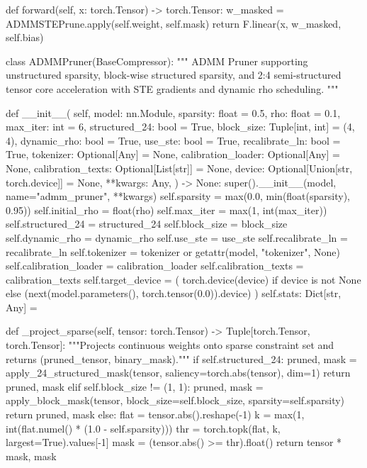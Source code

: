    def forward(self, x: torch.Tensor) -> torch.Tensor:
        w\_masked = ADMMSTEPrune.apply(self.weight, self.mask)
        return F.linear(x, w\_masked, self.bias)


class ADMMPruner(BaseCompressor):
    """
    ADMM Pruner supporting unstructured sparsity, block-wise structured sparsity,
    and 2:4 semi-structured tensor core acceleration with STE gradients and dynamic rho scheduling.
    """

    def \_\_init\_\_(
        self,
        model: nn.Module,
        sparsity: float = 0.5,
        rho: float = 0.1,
        max\_iter: int = 6,
        structured\_24: bool = True,
        block\_size: Tuple[int, int] = (4, 4),
        dynamic\_rho: bool = True,
        use\_ste: bool = True,
        recalibrate\_ln: bool = True,
        tokenizer: Optional[Any] = None,
        calibration\_loader: Optional[Any] = None,
        calibration\_texts: Optional[List[str]] = None,
        device: Optional[Union[str, torch.device]] = None,
        **kwargs: Any,
    ) -> None:
        super().\_\_init\_\_(model, name="admm\_pruner", **kwargs)
        self.sparsity = max(0.0, min(float(sparsity), 0.95))
        self.initial\_rho = float(rho)
        self.max\_iter = max(1, int(max\_iter))
        self.structured\_24 = structured\_24
        self.block\_size = block\_size
        self.dynamic\_rho = dynamic\_rho
        self.use\_ste = use\_ste
        self.recalibrate\_ln = recalibrate\_ln
        self.tokenizer = tokenizer or getattr(model, "tokenizer", None)
        self.calibration\_loader = calibration\_loader
        self.calibration\_texts = calibration\_texts
        self.target\_device = (
            torch.device(device)
            if device is not None
            else (next(model.parameters(), torch.tensor(0.0)).device)
        )
        self.stats: Dict[str, Any] = {}

    def \_project\_sparse(self, tensor: torch.Tensor) -> Tuple[torch.Tensor, torch.Tensor]:
        """Projects continuous weights onto sparse constraint set and returns (pruned\_tensor, binary\_mask)."""
        if self.structured\_24:
            pruned, mask = apply\_24\_structured\_mask(tensor, saliency=torch.abs(tensor), dim=1)
            return pruned, mask
        elif self.block\_size != (1, 1):
            pruned, mask = apply\_block\_mask(tensor, block\_size=self.block\_size, sparsity=self.sparsity)
            return pruned, mask
        else:
            flat = tensor.abs().reshape(-1)
            k = max(1, int(flat.numel() * (1.0 - self.sparsity)))
            thr = torch.topk(flat, k, largest=True).values[-1]
            mask = (tensor.abs() >= thr).float()
            return tensor * mask, mask

